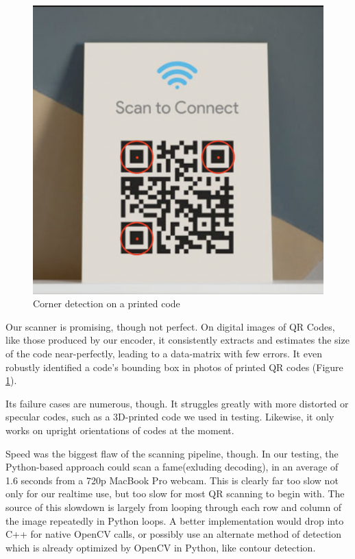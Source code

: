 \documentclass[10pt,twocolumn,letterpaper]{article}
\begin{document}
\begin{figure}[t]
   \begin{center}
      \includegraphics[width=0.8\linewidth]{print.png}
   \end{center}
      \caption{Corner detection on a printed code}
   \label{fig:print}
\end{figure}

Our scanner is promising, though not perfect. On digital images of QR Codes, like those produced by our encoder, it consistently extracts and estimates the size of the code near-perfectly, leading to a data-matrix with few errors. It even robustly identified a code's bounding box in photos of printed QR codes (Figure \ref{fig:print}).

Its failure cases are numerous, though. It struggles greatly with more distorted or specular codes, such as a 3D-printed code we used in testing. Likewise, it only works on upright orientations of codes at the moment.

Speed was the biggest flaw of the scanning pipeline, though. In our testing, the Python-based approach could scan a fame(exluding decoding), in an average of 1.6 seconds from a 720p MacBook Pro webcam. This is clearly far too slow not only for our realtime use, but too slow for most QR scanning to begin with. The source of this slowdown is largely from looping through each row and column of the image repeatedly in Python loops. A better implementation would drop into C++ for native OpenCV calls, or possibly use an alternate method of detection which is already optimized by OpenCV in Python, like contour detection.
\end{document}
